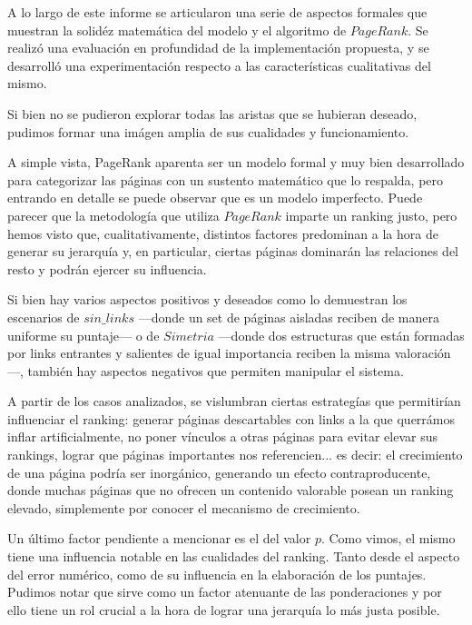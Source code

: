 \vspace{1em}

A lo largo de este informe se articularon una serie de aspectos formales que muestran la solidéz matemática del modelo y el algoritmo de $PageRank$. Se realizó una evaluación en profundidad de la implementación propuesta, y se desarrolló una experimentación respecto a las características cualitativas del mismo. 

Si bien no se pudieron explorar todas las aristas que se hubieran deseado, pudimos formar una imágen amplia de sus cualidades y funcionamiento. 
\vspace{1em}

A simple vista, PageRank aparenta ser un modelo formal y muy bien desarrollado para categorizar las páginas con un sustento matemático que lo respalda, pero entrando en detalle se puede observar que es un modelo imperfecto. Puede parecer que la metodología que utiliza $PageRank$ imparte un ranking justo, pero hemos visto que, cualitativamente, distintos factores predominan a la hora de generar su jerarquía y, en particular, ciertas páginas dominarán las relaciones del resto y podrán ejercer su influencia.  

\vspace{1em}

Si bien hay varios aspectos positivos y deseados como lo demuestran los escenarios de $sin\_links$ ---donde un set de páginas aisladas reciben de manera uniforme su puntaje--- o de $Simetria$ ---donde dos estructuras que están formadas por links entrantes y salientes de igual importancia reciben la misma valoración---, también hay aspectos negativos que permiten manipular el sistema.

\vspace{1em}

A partir de los casos analizados, se vislumbran ciertas estrategías que permitirían influenciar el ranking: generar páginas descartables con links a la que querrámos inflar artificialmente, no poner vínculos a otras páginas para evitar elevar sus rankings, lograr que páginas importantes nos referencien... es decir: el crecimiento de una página podría ser inorgánico, generando un efecto contraproducente, donde muchas páginas que no ofrecen un contenido valorable posean un ranking elevado, simplemente por conocer el mecanismo de crecimiento.

\vspace{1em}
Un último factor pendiente a mencionar es el del valor $p$. Como vimos, el mismo tiene una influencia notable en las cualidades del ranking. Tanto desde el aspecto del error numérico, como de su influencia en la elaboración de los puntajes. Pudimos notar que sirve como un factor atenuante de las ponderaciones y por ello tiene un rol crucial a la hora de lograr una jerarquía lo más justa posible.  

